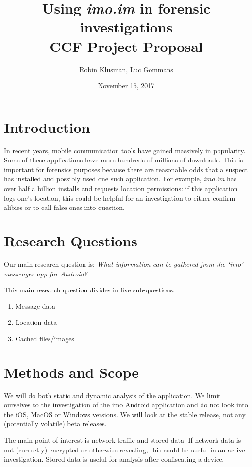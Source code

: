 \documentclass{article}
\title{Using {\it imo.im} in forensic investigations \\
	\vspace{0.3cm}
	{\large CCF Project Proposal}
}
\date{November 16, 2017}
\author{Robin Klusman, Luc Gommans}
\begin{document}
\maketitle

\section{Introduction}

In recent years, mobile communication tools have gained massively in
popularity. Some of these applications have more hundreds of millions of
downloads. This is important for forensics purposes because there are
reasonable odds that a suspect has installed and possibly used one such
application. For example, {\it imo.im} has over half a billion installs and
requests location permissions: if this application logs one's location, this
could be helpful for an investigation to either confirm alibies or to call
false ones into question.


\section{Research Questions}

Our main research question is:
{\it What information can be gathered from the `imo' messenger app for Android?}

This main research question divides in five sub-questions:

\begin{enumerate}
	\item Message data
	\item Location data
	\item Cached files/images
\end{enumerate}


\section{Methods and Scope}

We will do both static and dynamic analysis of the application. We limit
ourselves to the investigation of the imo Android application and do not look
into the iOS, MacOS or Windows versions. We will look at the stable release,
not any (potentially volatile) beta releases.

The main point of interest is network traffic and stored data. If network data
is not (correctly) encrypted or otherwise revealing, this could be useful in an
active investigation. Stored data is useful for analysis after confiscating a
device.
\end{document}
